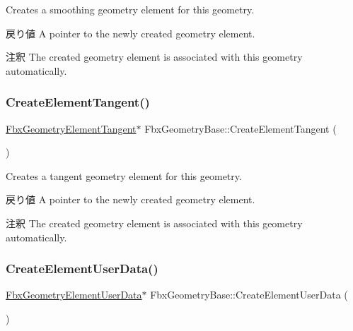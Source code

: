 Creates a smoothing geometry element for this geometry. \begin{DoxyReturn}{戻り値}
A pointer to the newly created geometry element. 
\end{DoxyReturn}
\begin{DoxyRemark}{注釈}
The created geometry element is associated with this geometry automatically. 
\end{DoxyRemark}
\mbox{\label{class_fbx_geometry_base_a88790830df691da97b5f027a66d98eec}} 
\subsubsection{\texorpdfstring{Create\+Element\+Tangent()}{CreateElementTangent()}}
{\footnotesize\ttfamily \hyperlink{fbxlayer_8h_a291cacd8b247483cc24704c8f49087a7}{Fbx\+Geometry\+Element\+Tangent}$\ast$ Fbx\+Geometry\+Base\+::\+Create\+Element\+Tangent (\begin{DoxyParamCaption}{ }\end{DoxyParamCaption})}

Creates a tangent geometry element for this geometry. \begin{DoxyReturn}{戻り値}
A pointer to the newly created geometry element. 
\end{DoxyReturn}
\begin{DoxyRemark}{注釈}
The created geometry element is associated with this geometry automatically. 
\end{DoxyRemark}
\mbox{\label{class_fbx_geometry_base_a457a8982320b3637353051aaec987c90}} 
\subsubsection{\texorpdfstring{Create\+Element\+User\+Data()}{CreateElementUserData()}}
{\footnotesize\ttfamily \hyperlink{fbxlayer_8h_acef498b248e323a189b5ccbf478b0b41}{Fbx\+Geometry\+Element\+User\+Data}$\ast$ Fbx\+Geometry\+Base\+::\+Create\+Element\+User\+Data (\begin{DoxyParamCaption}{ }\end{DoxyParamCaption})}

